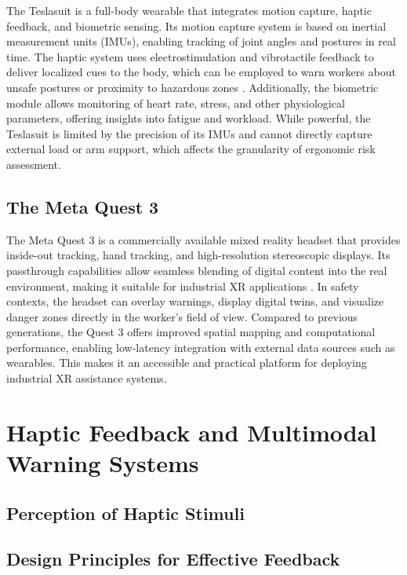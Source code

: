 The Teslasuit is a full-body wearable that integrates motion capture, haptic feedback,
and biometric sensing. Its motion capture system is based on inertial measurement
units (IMUs), enabling tracking of joint angles and postures in real time. The haptic
system uses electrostimulation and vibrotactile feedback to deliver localized cues to
the body, which can be employed to warn workers about unsafe postures or proximity
to hazardous zones \cite{teslasuitwhitepaper}. Additionally, the biometric module allows
monitoring of heart rate, stress, and other physiological parameters, offering insights
into fatigue and workload. While powerful, the Teslasuit is limited by the precision of
its IMUs and cannot directly capture external load or arm support, which affects the
granularity of ergonomic risk assessment.

\subsection{The Meta Quest 3}

The Meta Quest 3 is a commercially available mixed reality headset that provides
inside-out tracking, hand tracking, and high-resolution stereoscopic displays.
Its passthrough capabilities allow seamless blending of digital content into the
real environment, making it suitable for industrial XR applications \cite{metaquest2023}. 
In safety contexts, the headset can overlay warnings, display digital twins, and 
visualize danger zones directly in the worker’s field of view. Compared to previous 
generations, the Quest 3 offers improved spatial mapping and computational 
performance, enabling low-latency integration with external data sources such 
as wearables. This makes it an accessible and practical platform for deploying 
industrial XR assistance systems.

\section{Haptic Feedback and Multimodal Warning Systems}
\subsection{Perception of Haptic Stimuli}

\subsection{Design Principles for Effective Feedback}

